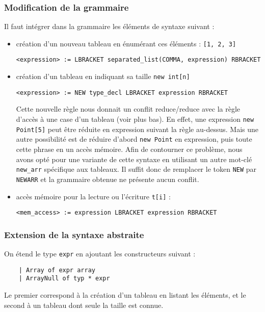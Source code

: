 \documentclass{article}
\begin{document}
\subsubsection{Modification de la grammaire}
Il faut intégrer dans la grammaire les éléments de syntaxe suivant : 
\begin{itemize}
    \item création d'un nouveau tableau en énumérant ces éléments : \texttt{[1, 2, 3]}
            \begin{lstlisting}[style=mystyle]
<expression> := LBRACKET separated_list(COMMA, expression) RBRACKET\end{lstlisting}
    \item création d'un tableau en indiquant sa taille \texttt{new int[n]}
    \begin{lstlisting}[style=mystyle]
<expression> := NEW type_decl LBRACKET expression RBRACKET\end{lstlisting}
        Cette nouvelle règle nous donnait un conflit reduce/reduce avec la règle d'accès à une case d'un tableau (voir plus bas).
        En effet, une expression \texttt{new Point[5]} peut être réduite en expression suivant la règle au-dessus.
        Mais une autre possibilité est de réduire d'abord \texttt{new Point} en expression, puis toute 
        cette phrase en un accès mémoire.
        Afin de contourner ce problème, nous avons opté pour une variante de cette syntaxe 
        en utilisant un autre mot-clé \texttt{new\_arr} spécifique aux tableaux.
        Il suffit donc de remplacer le token \texttt{NEW} par \texttt{NEWARR} et la grammaire 
        obtenue ne présente aucun conflit.
    \item accès mémoire pour la lecture ou l'écriture \texttt{t[i]} : 
    \begin{lstlisting}[style=mystyle]
<mem_access> := expression LBRACKET expression RBRACKET\end{lstlisting}
    \end{itemize}

\subsubsection{Extension de la syntaxe abstraite}
On étend le type \texttt{expr} en ajoutant les constructeurs suivant : 
\begin{verbatim}
    | Array of expr array
    | ArrayNull of typ * expr
\end{verbatim}

Le premier correspond à la création d'un tableau en listant les éléments, et le second 
à un tableau dont seule la taille est connue.
\end{document}
